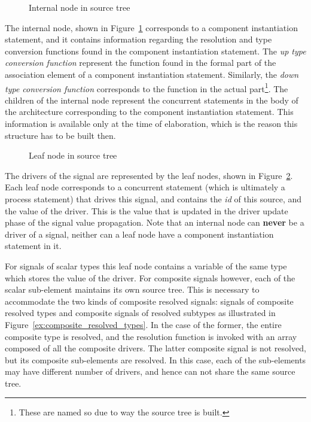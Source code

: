\documentclass[11pt]{article}
\begin{document}
\begin{figure}[htbp]
  \centerline{}
  \caption{Internal node in source tree}
  \label{fig:internal_node}
\end{figure}

The internal node, shown in Figure~\ref{fig:internal_node} corresponds
to a component instantiation statement, and it contains information
regarding the resolution and type conversion functions found in the
component instantiation statement.  The \textit{up type conversion
function} represent the function found in the formal part of the
association element of a component instantiation statement.
Similarly, the \textit{down type conversion function} corresponds to
the function in the actual part\footnote{These are named so due to way
the source tree is built.}.  The children of the internal node
represent the concurrent statements in the body of the architecture
corresponding to the component instantiation statement.  This
information is available only at the time of elaboration, which is the
reason this structure has to be built then.

\begin{figure}[htbp]
  \centerline{}
  \caption{Leaf node in source tree}
  \label{fig:leaf_node}
\end{figure}

The drivers of the signal are represented by the leaf nodes, shown in
Figure~\ref{fig:leaf_node}.  Each leaf node corresponds to a
concurrent statement (which is ultimately a process statement) that
drives this signal, and contains the \textit{id} of this source, and
the value of the driver.  This is the value that is updated in the
driver update phase of the signal value propagation.  Note that an
internal node can \textbf{never} be a driver of a signal, neither can
a leaf node have a component instantiation statement in it.

For signals of scalar types this leaf node contains a variable of the
same type which stores the value of the driver.  For composite signals
however, each of the scalar sub-element maintains its own source tree.
This is necessary to accommodate the two kinds of composite resolved
signals: signals of composite resolved types and composite signals of
resolved subtypes as illustrated in
Figure~\ref{ex:composite_resolved_types}.  In the case of the former,
the entire composite type is resolved, and the resolution function is
invoked with an array composed of all the composite drivers.  The
latter composite signal is not resolved, but its composite
sub-elements are resolved.  In this case, each of the sub-elements may
have different number of drivers, and hence can not share the same
source tree.
\end{document}
